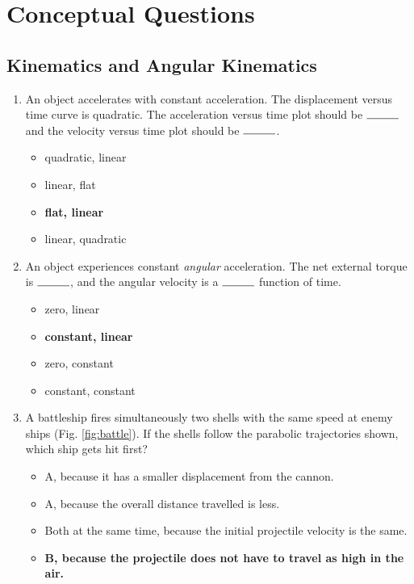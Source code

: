 \documentclass[10pt]{article}
\begin{document}
\maketitle

\section{Conceptual Questions}
\subsection{Kinematics and Angular Kinematics}
\begin{enumerate}
\item An object accelerates with constant acceleration.  The displacement versus time curve is quadratic.  The acceleration versus time plot should be $\rule{1cm}{0.15mm}$ and the velocity versus time plot should be $\rule{1cm}{0.15mm}$.
\begin{itemize}
\item quadratic, linear
\item linear, flat
\item \textbf{flat, linear}
\item linear, quadratic
\end{itemize}
\item An object experiences constant \textit{angular} acceleration.  The net external torque is $\rule{1cm}{0.15mm}$, and the angular velocity is a $\rule{1cm}{0.15mm}$ function of time.
\begin{itemize}
\item zero, linear
\item \textbf{constant, linear}
\item zero, constant
\item constant, constant
\end{itemize}
\item A battleship fires simultaneously two shells with the same speed at enemy ships (Fig. \ref{fig:battle}).  If the shells follow the parabolic trajectories shown, which ship gets hit first?
\begin{itemize}
\item A, because it has a smaller displacement from the cannon.
\item A, because the overall distance travelled is less.
\item Both at the same time, because the initial projectile velocity is the same.
\item \textbf{B, because the projectile does not have to travel as high in the air.}

\end{itemize}
\end{enumerate}
\end{document}
